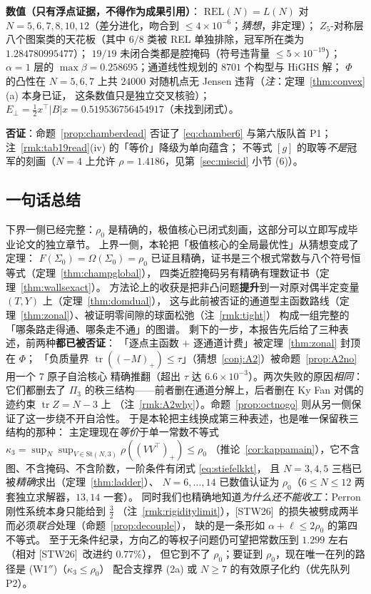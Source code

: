 \documentclass[UTF8,11pt]{ctexart}
\theoremstyle{definition}
\newcommand{\tr}{\operatorname{tr}}
\newcommand{\STW}{\textup{[STW26]}}
\begin{document}
\textbf{数值（只有浮点证据，不得作为成果引用）}：
$\mathrm{REL}(N)=L(N)$ 对 $N=5,6,7,8,10,12$（差分进化，吻合到 $\le4\times10^{-6}$；\emph{猜想}，非定理）；
$Z_5$-对称层八个图案类的天花板（其中 $6/8$ 类被 REL 单独排除，冠军所在类为 $1.284780995477$）；
$19/19$ 未闭合类都是腔掩码（符号违背量 $\le5\times10^{-19}$）；
$\alpha=1$ 层的 $\max\beta=0.258695$；通道线性规划的 $8701$ 个构型与 HiGHS 解；
$\Phi$ 的凸性在 $N=5,6,7$ 上共 $24000$ 对随机点无 Jensen 违背（\emph{注}：定理~\ref{thm:convex}(a) 本身已证，
这条数值只是独立交叉核验）；
$E_\perp=\frac12x^\top|B|x=0.519536756454917$（未找到闭式）。

\textbf{否证}：命题~\ref{prop:chamberdead} 否证了 \eqref{eq:chamber6} 与第六版队首 P1；
注~\ref{rmk:tab19read}(iv) 的「等价」降级为单向蕴含；
不等式 $[g]$ 的取等\emph{不是}冠军的刻画（$N=4$ 上允许 $\rho=1.4186$，见第~\ref{sec:miscid} 小节 (6)）。

\subsection{一句话总结}

下界一侧已经完整：$\rho_0$ 是精确的，极值核心已闭式刻画，这部分可以立即写成毕业论文的独立章节。
上界一侧，本轮把「极值核心的全局最优性」从猜想变成了定理：
$F(\Sigma_0)=\Omega(\Sigma_0)=\rho_0$ 已证且精确，证书是三个根式常数与八个符号恒等式（定理~\ref{thm:champglobal}），
四类近腔掩码另有精确有理数证书（定理~\ref{thm:wallsexact}）。
方法论上的收获是把非凸问题\textbf{提升}到一对原对偶半定变量 $(T,Y)$ 上（定理~\ref{thm:domdual}），
这与此前被否证的通道型主函数路线（定理~\ref{thm:zonal}）、被证明零间隙的球面松弛（注~\ref{rmk:tight}）
构成一组完整的「哪条路走得通、哪条走不通」的图谱。
剩下的一步，本报告先后给了三种表述，前两种\textbf{都已被否证}：
「逐点主函数 $+$ 逐通道计费」被定理~\ref{thm:zonal} 封顶在 $\Phi$；
「负质量界 $\tr((-M)_+)\le\tau$」（猜想~\ref{conj:A2}）被命题~\ref{prop:A2no} 用一个 $7$ 原子自洽核心
精确推翻（超出 $\tau$ 达 $6.6\times10^{-3}$）。两次失败的原因\emph{相同}：
它们都删去了 $\Pi_3$ 的秩三结构——前者删在通道分解上，后者删在 Ky Fan 对偶的迹约束 $\tr Z=N-3$ 上
（注~\ref{rmk:A2why}）。命题~\ref{prop:octnogo} 则从另一侧保证了这一步绕不开自洽性。
于是本轮把主线换成第三种表述，也是唯一保留秩三结构的那种：
主定理现在\emph{等价}于单一常数不等式 $\kappa_3=\sup_N\sup_{V\in\mathrm{St}(N,3)}\rho((VV^\top)_+)\le\rho_0$
（推论~\ref{cor:kappamain}），它不含图、不含掩码、不含阶数，一阶条件有闭式 \eqref{eq:stiefelkkt}，
且 $N=3,4,5$ 三档已被\emph{精确}求出（定理~\ref{thm:ladder}）、
$N=6,\dots,14$ 已数值认证为 $\rho_0$（$6\le N\le12$ 两套独立求解器，$13,14$ 一套）。
同时我们也精确地知道\emph{为什么还不能收工}：Perron 刚性系统本身只能给到 $\frac32$
（注~\ref{rmk:rigiditylimit}），\STW\ 的损失被劈成两半而必须\emph{联合}处理（命题~\ref{prop:decouple}），
缺的是一条形如 $\alpha+\ell\le2\rho_0$ 的第四不等式。
至于无条件纪录，方向乙的等权子问题仍可望把常数压到 $1.299$ 左右（相对 \STW\ 改进约 $0.77\%$），
但它到不了 $\rho_0$；要证到 $\rho_0$，现在唯一在列的路径是 (W1$''$)（$\kappa_3\le\rho_0$）
配合支撑界 (2a) 或 $N\ge7$ 的有效原子化约（优先队列 P2）。
\end{document}
